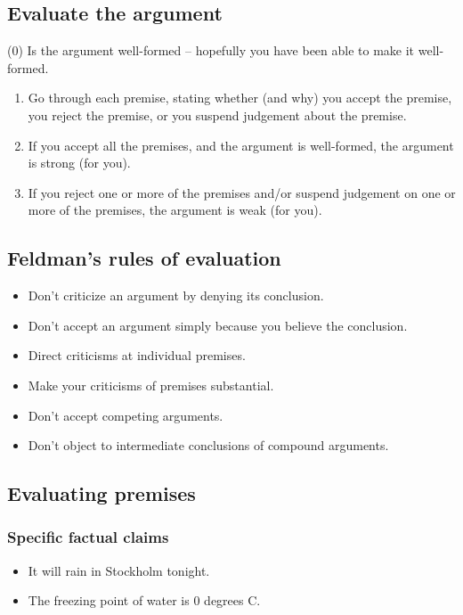 \subsection{Evaluate the argument}
(0) Is the argument well-formed -- hopefully you have been
        able to make it well-formed.
\begin{enumerate}
    \item Go through each premise, stating whether (and why) you accept
        the premise, you reject the premise, or you suspend judgement about
        the premise.
    \item If you accept all the premises, and the argument is well-formed,
        the argument is strong (for you).
    \item If you reject one or more of the premises and/or suspend judgement
        on one or more of the premises, the argument is weak (for you).
\end{enumerate}

\subsection{Feldman's rules of evaluation}

\begin{itemize}
    \item Don't criticize an argument by denying its conclusion.
    \item Don't accept an argument simply because you believe the conclusion.
    \item Direct criticisms at individual premises.
    \item Make your criticisms of premises substantial.
    \item Don't accept competing arguments.
    \item Don't object to intermediate conclusions of compound arguments.
\end{itemize}

\subsection{Evaluating premises}

\subsubsection{Specific factual claims}

\begin{itemize}
    \item It will rain in Stockholm tonight.
    \item The freezing point of water is 0 degrees C.
\end{itemize}

